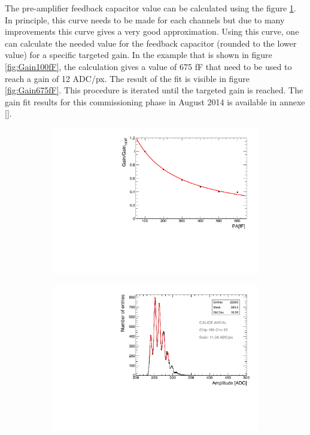 The pre-amplifier feedback capacitor value can be calculated using the figure \ref{fig:PA_curve}. In principle, this curve needs to be made for each channels but due to many improvements this curve gives a very good approximation. Using this curve, one can calculate the needed value for the feedback capacitor (rounded to the lower value) for a specific targeted gain. In the example that is shown in figure \ref{fig:Gain100fF}, the calculation gives a value of 675 fF that need to be used to reach a gain of 12 ADC/px. The result of the fit is visible in figure \ref{fig:Gain675fF}. This procedure is iterated until the targeted gain is reached. The gain fit results for this commissioning phase in August 2014 is available in annexe \ref{}.

\begin{figure}[htbp!]
  \centering
  \begin{subfigure}[t]{0.49\textwidth}
    \includegraphics[width=1.\linewidth]{chap4/fig_Commi/GainvsPA.pdf}
    \caption{} \label{fig:PA_curve}
  \end{subfigure}
  \hfill
  \begin{subfigure}[t]{0.49\textwidth}
    \includegraphics[width=1.\linewidth]{chap4/fig_Commi/Gain675fF_MainzHBU4.pdf}

\end{subfigure}
\end{figure}

